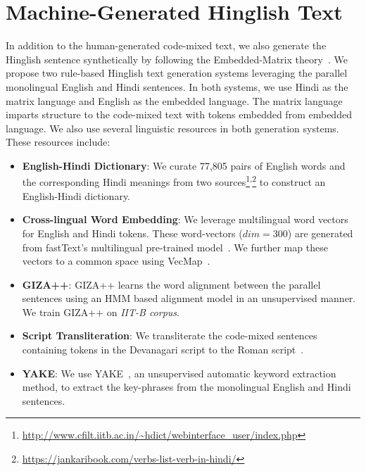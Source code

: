 \documentclass[11pt]{article}
\begin{document}
\section{Machine-Generated Hinglish Text}
\label{sec: machine}
In addition to the human-generated code-mixed text, we also generate the Hinglish sentence synthetically by following the Embedded-Matrix theory~\cite{joshi1982processing}. We propose two rule-based Hinglish text generation systems leveraging the parallel monolingual English and Hindi sentences. In both systems, we use Hindi as the matrix language and English as the embedded language. The matrix language imparts structure to the code-mixed text with tokens embedded from embedded language. We also use several linguistic resources in both generation systems. These resources include:

\begin{itemize}
\item \textbf{English-Hindi Dictionary}: We curate 77,805 pairs of English words and the corresponding Hindi meanings from two sources\footnote{\url{http://www.cfilt.iitb.ac.in/~hdict/webinterface\_user/index.php}}\textsuperscript{,}\footnote{\url{https://jankaribook.com/verbs-list-verb-in-hindi/}} to construct an English-Hindi dictionary.
\item
\textbf{Cross-lingual Word Embedding}: We leverage multilingual word vectors for English and Hindi tokens. These word-vectors ($dim=300$) are generated from fastText's multilingual pre-trained model~\cite{bojanowski2017enriching}.   We further map these vectors to a common space using VecMap~\cite{artetxe2018acl}.    

\item
\textbf{GIZA++}: GIZA++ \cite{och03:asc} learns the word alignment between the parallel sentences using an HMM based alignment model in an unsupervised manner. We train GIZA++ on \textit{IIT-B corpus}.

\item
\textbf{Script Transliteration}: We transliterate the code-mixed sentences containing tokens in the Devanagari script to the Roman script~\cite{Ritwik2019}.  

\item
\textbf{YAKE}: We use YAKE~\cite{campos2020yake}, an unsupervised automatic keyword extraction method, to extract the key-phrases from the monolingual English and Hindi sentences.
\end{itemize}
\end{document}
